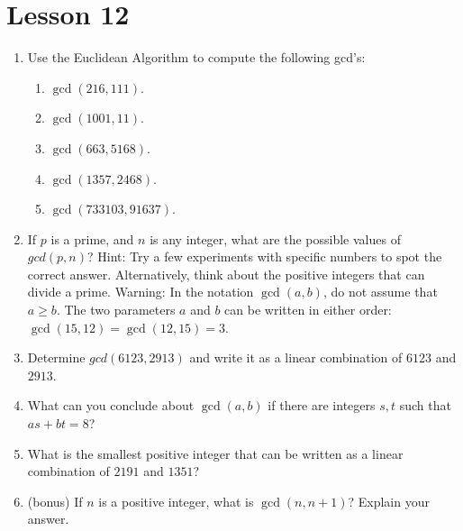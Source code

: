 \documentclass[11pt]{amsart}
\begin{document}
\section{Lesson 12}

\begin{enumerate}

\item Use the Euclidean Algorithm to compute the following gcd's:\\[3pt]
 \begin{enumerate}
 \item $\gcd(216,111)$.\\[3pt]
 \item $\gcd(1001,11)$.\\[3pt]
 \item $\gcd(663,5168)$.\\[3pt]
 \item $\gcd(1357,2468)$.\\[3pt]
 \item $\gcd(733103,91637)$.\\[5pt]
 \end{enumerate}
 
 
\item  If $p$ is a prime, and $n$ is any integer, what are the
possible values of $gcd(p,n)$?
Hint: Try a few experiments with specific numbers to spot the correct answer. Alternatively, think about the positive integers that can divide a prime. Warning: In the notation $\gcd(a,b)$, do not assume that $a\geq b$.
The two parameters $a$ and $b$ can be written in either order: $\gcd(15,12) = \gcd(12,15) = 3$.\\[5pt]

\item Determine $gcd(6123,2913)$ and write it as a linear combination of $6123$ and $2913$. \\[5pt]

\item What can you conclude about $\gcd(a,b)$ if there are integers $s,t$ such that $as+bt = 8$?\\[5pt]

\item What is the smallest positive integer that can be written as a linear combination of $2191$ and  $1351$?\\[5pt]


\item (bonus) If $n$ is a positive integer, what is $\gcd(n,n+1)$? Explain your answer.


\end{enumerate}
\end{document}
